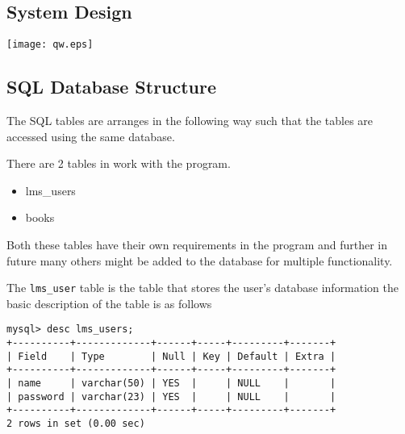 \documentclass[12pt, a4paper, titlepage, openany]{report}
\begin{document}
\subsection {System Design}

\texttt{[image: qw.eps]}

\newpage

\subsection{SQL Database Structure}
The SQL tables are arranges in the following way such that the tables are accessed using the same database.

There are 2 tables in work with the program.
\begin{itemize}
\item lms\_users
\item books
\end{itemize} 

Both these tables have their own requirements in the program and further in future many others might be added to the database for multiple functionality.

The \verb+lms_user+ table is the table that stores the user's database information the basic description of the table is as follows
\begin{verbatim}
mysql> desc lms_users;
+----------+-------------+------+-----+---------+-------+
| Field    | Type        | Null | Key | Default | Extra |
+----------+-------------+------+-----+---------+-------+
| name     | varchar(50) | YES  |     | NULL    |       |
| password | varchar(23) | YES  |     | NULL    |       |
+----------+-------------+------+-----+---------+-------+
2 rows in set (0.00 sec)
\end{verbatim}
\end{document}
